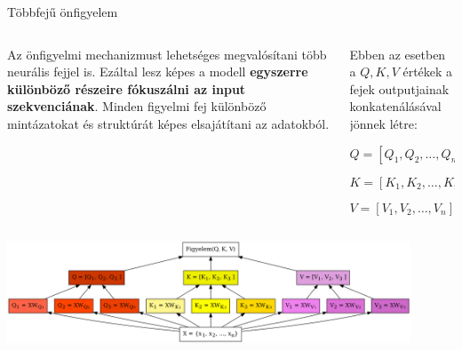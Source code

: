 \documentclass[english, aspectratio=169]{beamer}
\begin{document}
\begin{frame}{Többfejű önfigyelem}
\begin{columns}
\begin{column}{.4\textwidth}
Az önfigyelmi mechanizmust lehetséges megvalósítani több neurális fejjel is. Ezáltal lesz képes a modell \textbf{egyszerre különböző részeire fókuszálni az input szekvenciának}. Minden figyelmi fej különböző mintázatokat és struktúrát képes elsajátítani az adatokból. 
\end{column}
\begin{column}{.6\textwidth}
Ebben az esetben a $Q,K,V$ értékek a fejek outputjainak konkatenálásával jönnek létre:
\begin{block}{}
\vspace{-0.2cm}
\[
Q=\left[ Q_1,Q_2,\ldots,Q_n \right]
\]
\end{block}
\begin{block}{}
\vspace{-0.2cm}
\[
K=\left[ K_1,K_2,\ldots,K_n \right]
\]
\end{block}
\begin{block}{}
\vspace{-0.2cm}
\[
V=\left[ V_1,V_2,\ldots,V_n \right]
\]
\end{block}
\end{column}
\end{columns}
\begin{center}
\includegraphics[width=12cm, keepaspectratio]{graphs/transformer_19.png}
\end{center}
\end{frame}
\end{document}
